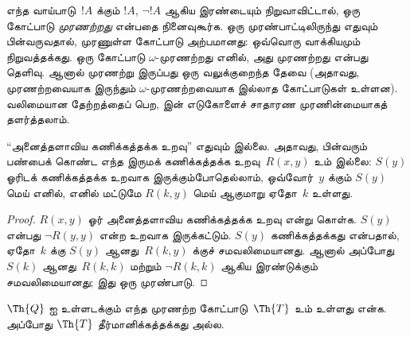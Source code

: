 \documentclass[../../../include/open-logic-section]{subfiles}
\begin{document}



\begin{explain}
எந்த வாய்பாடு~$!A$ க்கும் $!A$, $\lnot !A$ ஆகிய இரண்டையும்
நிறுவாவிட்டால், ஒரு கோட்பாடு \emph{முரணற்றது} என்பதை நினைவுகூர்க.
ஒரு முரண்பாட்டிலிருந்து எதுவும் பின்வருவதால், முரணுள்ள கோட்பாடு
அற்பமானது: ஒவ்வொரு வாக்கியமும் நிறுவத்தக்கது. ஒரு கோட்பாடு
$\omega$-முரணற்றது எனில், அது முரணற்றது என்பது தெளிவு. ஆனால் முரணற்று
இருப்பது ஒரு வலுக்குறைந்த தேவை (அதாவது, முரணற்றவையாக இருந்தும்
$\omega$-முரணற்றவையாக இல்லாத கோட்பாடுகள் உள்ளன). வலிமையான தேற்றத்தைப்
பெற,  இன் எடுகோளைச் சாதாரண முரணின்மையாகத்
தளர்த்தலாம்.
\end{explain}

\begin{lem}
“அனைத்தளாவிய கணிக்கத்தக்க உறவு” எதுவும் இல்லை. அதாவது, பின்வரும்
பண்பைக் கொண்ட எந்த இருமக் கணிக்கத்தக்க உறவு~$R(x,y)$ உம் இல்லை:
$S(y)$ ஓரிடக் கணிக்கத்தக்க உறவாக இருக்கும்போதெல்லாம், ஒவ்வோர்~$y$ க்கும்
$S(y)$ மெய் எனில், எனில் மட்டுமே $R(k,y)$ மெய் ஆகுமாறு ஏதோ~$k$ உள்ளது.
\end{lem}

\begin{proof}
$R(x,y)$ ஓர் அனைத்தளாவிய கணிக்கத்தக்க உறவு என்று கொள்க.
$S(y)$ என்பது $\lnot R(y,y)$ என்ற உறவாக இருக்கட்டும்.
$S(y)$ கணிக்கத்தக்கது என்பதால், ஏதோ~$k$ க்கு $S(y)$ ஆனது~$R(k,y)$
க்குச் சமவலிமையானது. ஆனால் அப்போது $S(k)$ ஆனது~$R(k,k)$ மற்றும்
$\lnot R(k,k)$ ஆகிய இரண்டுக்கும் சமவலிமையானது; இது ஒரு முரண்பாடு.
\end{proof}

\begin{thm}
$\Th{Q}$ ஐ உள்ளடக்கும் எந்த முரணற்ற கோட்பாடு~$\Th{T}$ உம் உள்ளது என்க.
அப்போது $\Th{T}$ தீர்மானிக்கத்தக்கது அல்ல.
\end{thm}
\end{document}
